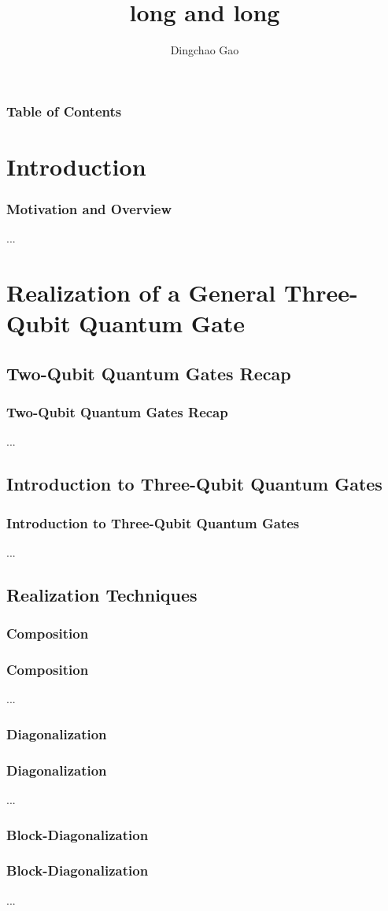\documentclass[aspectratio=1610]{beamer}
\title[]{long and long}
\author[Gcc]{Dingchao Gao}
\institute[ISCAS]{Institute of Software Chinese Academy of Sciences}
\begin{document}
\frame{\titlepage}

\begin{frame}
\frametitle{Table of Contents}
\tableofcontents
\end{frame}

\section{Introduction}
\begin{frame}
\frametitle{Motivation and Overview}
...
\end{frame}

\section{Realization of a General Three-Qubit Quantum Gate}
\subsection{Two-Qubit Quantum Gates Recap}
\begin{frame}
\frametitle{Two-Qubit Quantum Gates Recap}
...
\end{frame}

\subsection{Introduction to Three-Qubit Quantum Gates}
\begin{frame}
\frametitle{Introduction to Three-Qubit Quantum Gates}
...
\end{frame}

\subsection{Realization Techniques}
\subsubsection{Composition}
\begin{frame}
\frametitle{Composition}
...
\end{frame}

\subsubsection{Diagonalization}
\begin{frame}
\frametitle{Diagonalization}
...
\end{frame}

\subsubsection{Block-Diagonalization}
\begin{frame}
\frametitle{Block-Diagonalization}
...
\end{frame}
\end{document}
